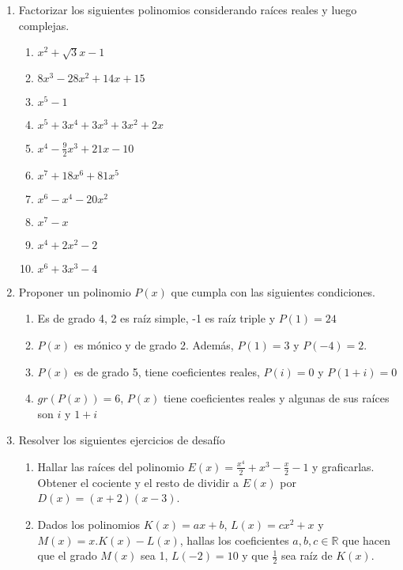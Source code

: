 \documentclass[a4paper]{article}
\newcommand{\exercise}{\item}
\newcommand{\df}[2]{\displaystyle\frac{#1}{#2}}
\begin{document}
\begin{enumerate}
\begin{multicols}{2}
\begin{enumerate} [label=(\alph*)]
		\item $3x^2+mx+4$ tiene a 1 como raíz
		\item $x^3+ax^2+bx+5$ es divisible por $Q(x)=x^2+x+1$
	\end{enumerate}
	\end{multicols}
	\exercise Factorizar los siguientes polinomios considerando raíces reales y luego complejas.
	\begin{multicols}{2}
	\begin{enumerate} [label=(\alph*)]
		\item $x^2+\sqrt{3}x-1$
		\item $8x^3-28x^2+14x+15$
		\item $x^5-1$
		\item $x^5+3x^4+3x^3+3x^2+2x$
		\item $x^4-\df{9}{2}x^3+21x-10$
		\item $x^7+18x^6+81x^5$
		\item $x^6-x^4-20x^2$
		\item $x^7-x$
		\item $x^4+2x^2-2$
		\item $x^6+3x^3-4$
	\end{enumerate}
	\end{multicols}
	\exercise Proponer un polinomio $P(x)$ que cumpla con las siguientes condiciones.
	\begin{multicols}{2}
	\begin{enumerate} [label=(\alph*)]
		\item Es de grado 4, 2 es raíz simple, -1 es raíz triple y $P(1)=24$
		\item $P(x)$ es mónico y de grado 2. Además, $P(1)=3$ y $P(-4)=2$.
		\item $P(x)$ es de grado 5, tiene coeficientes reales, $P(i)=0$ y $P(1+i)=0$
		\item $gr\left(P(x)\right)=6$, $P(x)$ tiene coeficientes reales y algunas de sus raíces son $i$ y $1+i$
	\end{enumerate}
	\end{multicols}
	\exercise Resolver los siguientes ejercicios de desafío
	\begin{enumerate} [label=(\alph*)]
		\item Hallar las raíces del polinomio $E(x)=\df{x^4}{2}+x^3-\df{x}{2}-1$ y graficarlas. Obtener el cociente y el resto de dividir a $E(x)$ por $D(x)=(x+2)(x-3)$.
		\item Dados los polinomios $K(x)=ax+b$, $L(x)=cx^2+x$ y $M(x)=x.K(x)-L(x)$, hallas los coeficientes $a,b,c \in \mathbb{R}$ que hacen que el grado $M(x)$ sea 1, $L(-2)=10$ y que $\df{1}{2}$ sea raíz de $K(x)$.

\end{enumerate}
\end{enumerate}
\end{document}
